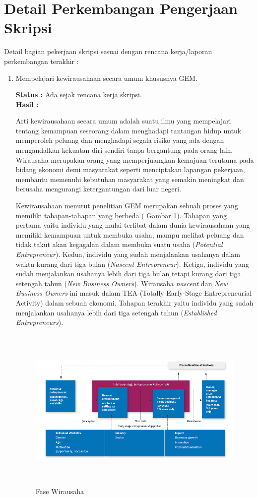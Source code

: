 \documentclass[a4paper,twoside]{article}
\begin{document}
\section{Detail Perkembangan Pengerjaan Skripsi}
Detail bagian pekerjaan skripsi sesuai dengan rencana kerja/laporan perkembangan terakhir :
	\begin{enumerate}
		\item Mempelajari kewirausahaan secara umum khususnya GEM.
		
		
		{\bf Status :} Ada sejak rencana kerja skripsi.\\
		{\bf Hasil :} 
		
		Arti kewirausahaan secara umum adalah suatu ilmu yang mempelajari tentang kemampuan seseorang dalam menghadapi tantangan hidup untuk memperoleh peluang dan menghadapi segala risiko yang ada dengan mengandalkan kekuatan diri sendiri tanpa bergantung pada orang lain. Wirausaha merupakan orang yang memperjuangkan kemajuan terutama pada bidang ekonomi demi masyarakat seperti menciptakan lapangan pekerjaan, membantu memenuhi kebutuhan masyarakat yang semakin meningkat dan berusaha mengurangi ketergantungan dari luar negeri.
		
		
		Kewirausahaan menurut penelitian GEM merupakan sebuah proses yang memiliki tahapan-tahapan yang berbeda ( Gambar \ref{fig:fasewirausaha}). Tahapan yang pertama yaitu individu yang mulai terlibat dalam dunia kewirausahaan yang memiliki kemampuan untuk membuka usaha, mampu melihat peluang dan tidak takut akan kegagalan dalam membuka suatu usaha (\textit{Potential Entrepreneur}). Kedua, individu yang sudah menjalankan usahanya dalam waktu kurang dari tiga bulan (\textit{Nascent Entrepreneur}). Ketiga, individu yang sudah menjalankan usahanya lebih dari tiga bulan tetapi kurang dari tiga setengah tahun (\textit{New Business Owners}). Wirausaha \textit{nascent} dan \textit{New Business Owners} ini masuk dalam TEA (Totally Early-Stage Entrepreneurial Activity) dalam sebuah ekonomi. Tahapan terakhir yaitu individu yang sudah menjalankan usahanya lebih dari tiga setengah tahun (\textit{Established Entrepreneurs}).
		
\begin{figure} [H]
	\centering  
	\includegraphics[width=16cm, height=8cm]{GEM2016-wirausaha}  
	\caption[Fase Wirausaha]{Fase Wirausaha} 
	\label{fig:fasewirausaha} 
\end{figure}
		


\end{enumerate}
\end{document}
